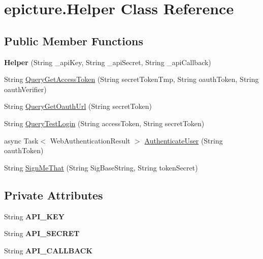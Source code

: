 \hypertarget{classepicture_1_1_helper}{}\section{epicture.\+Helper Class Reference}
\label{classepicture_1_1_helper}
\subsection*{Public Member Functions}
\begin{DoxyCompactItemize}
\item 
\mbox{\label{classepicture_1_1_helper_a97c8f872400d13dcf35f79d07c5d6c18}} 
{\bfseries Helper} (String \+\_\+api\+Key, String \+\_\+api\+Secret, String \+\_\+api\+Callback)
\item 
String \mbox{\hyperlink{classepicture_1_1_helper_a82fe7fbebbb5cee5e7787d5f7062bb5f}{Query\+Get\+Access\+Token}} (String secret\+Token\+Tmp, String oauth\+Token, String oauth\+Verifier)
\item 
String \mbox{\hyperlink{classepicture_1_1_helper_a9a42fa4d53acaed05f4985c8b2804417}{Query\+Get\+Oauth\+Url}} (String secret\+Token)
\item 
String \mbox{\hyperlink{classepicture_1_1_helper_ab01acef7d30c0270753f5deb838b993e}{Query\+Test\+Login}} (String access\+Token, String secret\+Token)
\item 
async Task$<$ Web\+Authentication\+Result $>$ \mbox{\hyperlink{classepicture_1_1_helper_af18b551f1629ecc0e6d8cacf1e9a4770}{Authenticate\+User}} (String oauth\+Token)
\item 
String \mbox{\hyperlink{classepicture_1_1_helper_a4ef537048b54f85c7f3e1a4c400e0b10}{Sign\+Me\+That}} (String Sig\+Base\+String, String token\+Secret)
\end{DoxyCompactItemize}
\subsection*{Private Attributes}
\begin{DoxyCompactItemize}
\item 
\mbox{\label{classepicture_1_1_helper_ac8fe9d1a7744bff69020ed3b1f654490}} 
String {\bfseries A\+P\+I\+\_\+\+K\+EY}
\item 
\mbox{\label{classepicture_1_1_helper_a9ba3a50bd3aed5c6b420bcda4a8b8d60}} 
String {\bfseries A\+P\+I\+\_\+\+S\+E\+C\+R\+ET}
\item 
\mbox{\label{classepicture_1_1_helper_acb2a04675547389a46a2b5877b7eefb7}} 
String {\bfseries A\+P\+I\+\_\+\+C\+A\+L\+L\+B\+A\+CK}
\end{DoxyCompactItemize}


